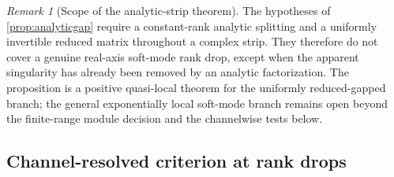 \documentclass[11pt]{article}
\theoremstyle{definition}
\theoremstyle{remark}
\newtheorem{remark}[theorem]{Remark}
\begin{document}
\begin{remark}[Scope of the analytic-strip theorem]
The hypotheses of \cref{prop:analyticgap} require a constant-rank analytic splitting and a uniformly invertible reduced matrix throughout a complex strip.  They therefore do not cover a genuine real-axis soft-mode rank drop, except when the apparent singularity has already been removed by an analytic factorization.  The proposition is a positive quasi-local theorem for the uniformly reduced-gapped branch; the general exponentially local soft-mode branch remains open beyond the finite-range module decision and the channelwise tests below.
\end{remark}

\subsection{Channel-resolved criterion at rank drops}
\end{document}
